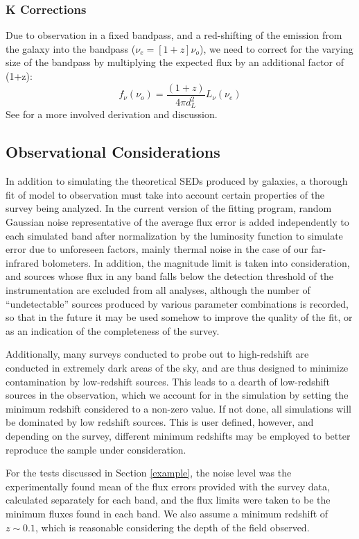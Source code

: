 \documentclass[twocolumn,letterpaper,10pt]{article}
\begin{document}
\subsubsection{K Corrections}

Due to observation in a fixed bandpass, and a red-shifting of the emission from the galaxy into the bandpass ($\nu_e=[1+z]\nu_o$), we need to correct for the varying size of the bandpass by multiplying the expected flux by an additional factor of (1+z):
$$
f_{\nu}(\nu_o)=\frac{(1+z)}{4\pi d_L^2}L_{\nu}(\nu_e)
$$
See \citet{Hogg02} for a more involved derivation and discussion.

\subsection{Observational Considerations}

In addition to simulating the theoretical SEDs produced by galaxies, a thorough fit of model to observation must take into account certain properties of the survey being analyzed. In the current version of the fitting program, random Gaussian noise representative of the average flux error is added independently to each simulated band after normalization by the luminosity function to simulate error due to unforeseen factors, mainly thermal noise in the case of our far-infrared bolometers. In addition, the magnitude limit is taken into consideration, and sources whose flux in any band falls below the detection threshold of the instrumentation are excluded from all analyses, although the number of ``undetectable'' sources produced by various parameter combinations is recorded, so that in the future it may be used somehow to improve the quality of the fit, or as an indication of the completeness of the survey.

Additionally, many surveys conducted to probe out to high-redshift are conducted in extremely dark areas of the sky, and are thus designed to minimize contamination by low-redshift sources. This leads to a dearth of low-redshift sources in the observation, which we account for in the simulation by setting the minimum redshift considered to a non-zero value. If not done, all simulations will be dominated by low redshift sources. This is user defined, however, and depending on the survey, different minimum redshifts may be employed to better reproduce the sample under consideration.

For the tests discussed in Section \ref{example}, the noise level was the experimentally found mean of the flux errors provided with the survey data, calculated separately for each band, and the flux limits were taken to be the minimum fluxes found in each band. We also assume a minimum redshift of $z\sim 0.1$, which is reasonable considering the depth of the field observed.
\end{document}
